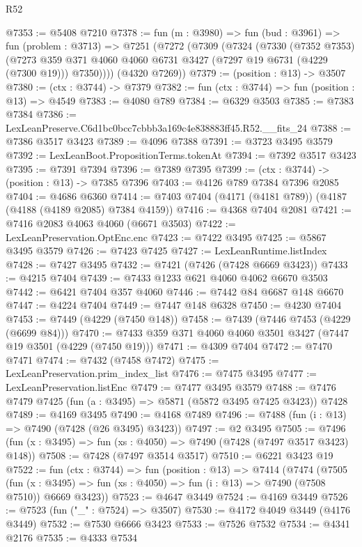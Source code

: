 \begin{lexlean}{R52}
\begin{coremodule}
@7353 := @5408 @7210
@7378 := fun (m : @3980) =>
  fun (bud : @3961) =>
  fun (problem : @3713) =>
  @7251
    (@7272
      (@7309
        (@7324
          (@7330
            (@7352 @7353)
            (@7273 @359 @371 @4060 @4060 @6731 @3427 (@7297 @19 @6731 (@4229 (@7300 @19))) @7350))))
      (@4320 @7269))
@7379 := (position : @13) -> @3507
@7380 := (ctx : @3744) -> @7379
@7382 := fun (ctx : @3744) => fun (position : @13) => @4549
@7383 := @4080 @789
@7384 := @6329 @3503
@7385 := @7383 @7384
@7386 := LexLeanPreserve.C6d1bc0bcc7cbbb3a169c4e838883ff45.R52.__fits_24
@7388 := @7386 @3517 @3423
@7389 := @4096 @7388
@7391 := @3723 @3495 @3579
@7392 := LexLeanBoot.PropositionTerms.tokenAt
@7394 := @7392 @3517 @3423
@7395 := @7391 @7394
@7396 := @7389 @7395
@7399 := (ctx : @3744) -> (position : @13) -> @7385 @7396
@7403 := @4126 @789 @7384 @7396 @2085
@7404 := @4686 @6360
@7414 := @7403 @7404 (@4171 (@4181 @789)) (@4187 (@4188 (@4189 @2085) @7384 @4159))
@7416 := @4368 @7404 @2081
@7421 := @7416 @2083 @4063 @4060 (@6671 @3503)
@7422 := LexLeanPreservation.OptEnc.enc
@7423 := @7422 @3495
@7425 := @5867 @3495 @3579
@7426 := @7423 @7425
@7427 := LexLeanRuntime.listIndex
@7428 := @7427 @3495
@7432 := @7421 (@7426 (@7428 @6669 @3423))
@7433 := @4215 @7404
@7439 := @7433 @1233 @621 @4060 @4062 @6670 @3503
@7442 := @6421 @7404 @357 @4060
@7446 := @7442 @84 @6687 @148 @6670
@7447 := @4224 @7404
@7449 := @7447 @148 @6328
@7450 := @4230 @7404
@7453 := @7449 (@4229 (@7450 @148))
@7458 := @7439 (@7446 @7453 (@4229 (@6699 @84)))
@7470 := @7433 @359 @371 @4060 @4060 @3501 @3427 (@7447 @19 @3501 (@4229 (@7450 @19)))
@7471 := @4309 @7404
@7472 := @7470 @7471
@7474 := @7432 (@7458 @7472)
@7475 := LexLeanPreservation.prim_index_list
@7476 := @7475 @3495
@7477 := LexLeanPreservation.listEnc
@7479 := @7477 @3495 @3579
@7488 := @7476 @7479 @7425 (fun (a : @3495) => @5871 (@5872 @3495 @7425 @3423)) @7428
@7489 := @4169 @3495
@7490 := @4168 @7489
@7496 := @7488 (fun (i : @13) => @7490 (@7428 (@26 @3495) @3423))
@7497 := @2 @3495
@7505 := @7496 (fun (x : @3495) => fun (xs : @4050) => @7490 (@7428 (@7497 @3517 @3423) @148))
@7508 := @7428 (@7497 @3514 @3517)
@7510 := @6221 @3423 @19
@7522 := fun (ctx : @3744) =>
  fun (position : @13) =>
  @7414
    (@7474
      (@7505
        (fun (x : @3495) => fun (xs : @4050) => fun (i : @13) => @7490 (@7508 @7510))
        @6669
        @3423))
@7523 := @4647 @3449
@7524 := @4169 @3449
@7526 := @7523 (fun ("_" : @7524) => @3507)
@7530 := @4172 @4049 @3449 (@4176 @3449)
@7532 := @7530 @6666 @3423
@7533 := @7526 @7532
@7534 := @4341 @2176
@7535 := @4333 @7534

\end{coremodule}
\end{lexlean}
